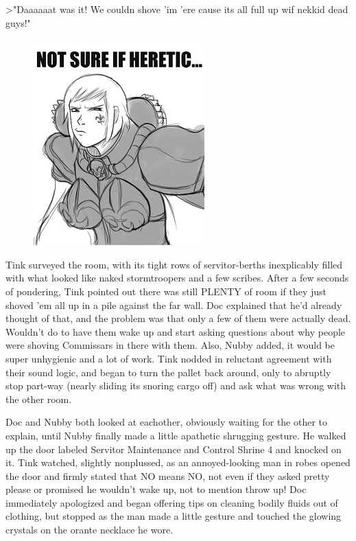 >"Daaaaaat was it! 
We couldn shove 'im 'ere cause its all full up wif nekkid dead guys!"

\begin{figure}
	\begin{center}
		\includegraphics[width=\figwidth]{pics/21/83.png}
	\end{center}
\end{figure}
Tink surveyed the room, with its tight rows of servitor-berths inexplicably filled with what looked like naked stormtroopers and a few scribes. 
After a few seconds of pondering, Tink pointed out there was still PLENTY of room if they just shoved 'em all up in a pile against the far wall. 
Doc explained that he'd already thought of that, and the problem was that only a few of them were actually dead. 
Wouldn't do to have them wake up and start asking questions about why people were shoving Commissars in there with them. 
Also, Nubby added, it would be super unhygienic and a lot of work. 
Tink nodded in reluctant agreement with their sound logic, and began to turn the pallet back around, only to abruptly stop part-way (nearly sliding its snoring cargo off) and ask what was wrong with the other room.

Doc and Nubby both looked at eachother, obviously waiting for the other to explain, until Nubby finally made a little apathetic shrugging gesture. 
He walked up the door labeled Servitor Maintenance and Control Shrine 4 and knocked on it. 
Tink watched, slightly nonplussed, as an annoyed-looking man in robes opened the door and firmly stated that NO means NO, not even if they asked pretty please or promised he wouldn't wake up, not to mention throw up! 
Doc immediately apologized and began offering tips on cleaning bodily fluids out of clothing, but stopped as the man made a little gesture and touched the glowing crystals on the orante necklace he wore.

